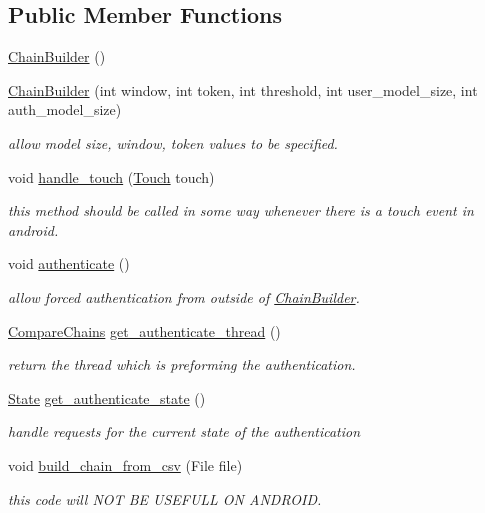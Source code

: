 \subsection*{Public Member Functions}
\begin{DoxyCompactItemize}
\item 
\hyperlink{classruntime_1_1_chain_builder_af43032940c67edb1efd6539d1e560881}{Chain\+Builder} ()
\item 
\hyperlink{classruntime_1_1_chain_builder_a99fd0c70e205e8117d1dc1cf07fed8a7}{Chain\+Builder} (int window, int token, int threshold, int user\+\_\+model\+\_\+size, int auth\+\_\+model\+\_\+size)
\begin{DoxyCompactList}\small\item\em allow model size, window, token values to be specified. \end{DoxyCompactList}\item 
void \hyperlink{classruntime_1_1_chain_builder_a4f42e44cba506f6ad523acb85c68701e}{handle\+\_\+touch} (\hyperlink{classcomponents_1_1_touch}{Touch} touch)
\begin{DoxyCompactList}\small\item\em this method should be called in some way whenever there is a touch event in android. \end{DoxyCompactList}\item 
void \hyperlink{classruntime_1_1_chain_builder_aa483e6832f09092ec52fdf715e6f4b5e}{authenticate} ()
\begin{DoxyCompactList}\small\item\em allow forced authentication from outside of \hyperlink{classruntime_1_1_chain_builder}{Chain\+Builder}. \end{DoxyCompactList}\item 
\hyperlink{classruntime_1_1_compare_chains}{Compare\+Chains} \hyperlink{classruntime_1_1_chain_builder_afec27831c01ad10069232680b82b3298}{get\+\_\+authenticate\+\_\+thread} ()
\begin{DoxyCompactList}\small\item\em return the thread which is preforming the authentication. \end{DoxyCompactList}\item 
\hyperlink{enumruntime_1_1_chain_builder_1_1_state}{State} \hyperlink{classruntime_1_1_chain_builder_ab01b027d8ad763c58fef515f6bdfe03d}{get\+\_\+authenticate\+\_\+state} ()
\begin{DoxyCompactList}\small\item\em handle requests for the current state of the authentication \end{DoxyCompactList}\item 
void \hyperlink{classruntime_1_1_chain_builder_aac13171465eedc1e37a39f740d44b3af}{build\+\_\+chain\+\_\+from\+\_\+csv} (File file)
\begin{DoxyCompactList}\small\item\em this code will N\+OT BE U\+S\+E\+F\+U\+LL ON A\+N\+D\+R\+O\+ID. \end{DoxyCompactList}\end{DoxyCompactItemize}
